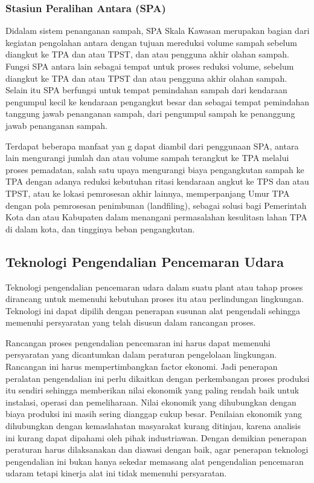 \documentclass[../wastek.tex]{subfiles}
\begin{document}
\subsubsection{Stasiun Peralihan Antara (SPA)}%
\label{ssub:stasiun_peralihan_antara_(spa)}

Didalam sistem penanganan sampah, SPA Skala Kawasan merupakan bagian dari kegiatan pengolahan antara dengan tujuan mereduksi volume sampah sebelum diangkut ke TPA dan atau TPST, dan atau pengguna akhir olahan sampah. Fungsi SPA antara lain sebagai tempat untuk proses reduksi volume, sebelum diangkut ke TPA dan atau TPST dan atau pengguna akhir olahan sampah. Selain itu SPA berfungsi untuk tempat pemindahan sampah dari kendaraan pengumpul kecil ke kendaraan pengangkut besar dan sebagai tempat pemindahan tanggung jawab penanganan sampah, dari pengumpul sampah ke penanggung jawab penanganan sampah.

Terdapat beberapa manfaat yan g dapat diambil dari penggunaan SPA, antara lain mengurangi jumlah dan atau volume sampah terangkut ke TPA melalui proses pemadatan, salah satu upaya mengurangi biaya pengangkutan sampah ke TPA dengan adanya reduksi kebutuhan ritasi kendaraan angkut ke TPS dan atau TPST, atau ke lokasi pemrosesan akhir lainnya, memperpanjang Umur TPA dengan pola pemrosesan penimbunan (landfiling), sebagai solusi bagi Pemerintah Kota dan atau Kabupaten dalam menangani permasalahan kesulitasn lahan TPA di dalam kota, dan tingginya beban pengangkutan.


\subsection{Teknologi Pengendalian Pencemaran Udara}%
\label{sub:teknologi_pengendalian_pencemaran_udara}

Teknologi pengendalian pencemaran udara dalam suatu plant atau tahap proses dirancang untuk memenuhi kebutuhan proses itu atau perlindungan lingkungan. Teknologi ini dapat dipilih dengan penerapan susunan alat pengendali sehingga memenuhi persyaratan yang telah disusun dalam rancangan proses.


Rancangan proses pengendalian pencemaran ini harus dapat memenuhi persyaratan yang dicantumkan dalam peraturan pengelolaan lingkungan. Rancangan ini harus mempertimbangkan factor ekonomi. Jadi penerapan peralatan pengendalian ini perlu dikaitkan dengan perkembangan proses produksi itu sendiri sehingga memberikan nilai ekonomik yang paling rendah baik untuk instalasi, operasi dan pemeliharaan. Nilai ekonomik yang dihubungkan dengan biaya produksi ini masih sering dianggap cukup besar. Penilaian ekonomik yang dihubungkan dengan kemaslahatan masyarakat kurang ditinjau, karena analisis ini kurang dapat dipahami oleh pihak industriawan. Dengan demikian penerapan peraturan harus dilaksanakan dan diawasi dengan baik, agar penerapan teknologi pengendalian ini bukan hanya sekedar memasang alat pengendalian pencemaran udaram tetapi kinerja alat ini tidak memenuhi persyaratan.
\end{document}
